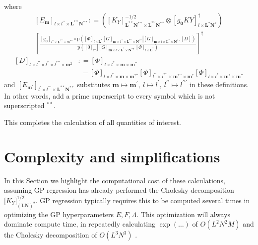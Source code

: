 \documentclass[preprint,12pt]{elsarticle}
\newcommand*{\M}[1]{\ensuremath{#1}\xspace}
\newcommand*{\x}{\times}
\newcommand*{\mi}[1]{\mathbf{#1}}
\newcommand*{\te}[2][]{\left\lbrack{#2}\right\rbrack_{#1}}
\newcommand*{\tte}[2][]{\lbrack{#2}\rbrack_{#1}}
\newcommand*{\prob}[3]{\M{\mathrm{p}\!\left(\left.{#1}\right\vert{#2,#3}\right)}}
\newcommand*{\deq}{\M{\mathrel{\mathop:}=}}
\begin{document}
        where
        \begin{multline*}
            \te[l\x l^{\prime\prime}\x \mi{L^{**}N^{**}}]{E_{\mi{m}}} \deq 
            \left(
                \te[\mi{L^{**}N^{**}}\x\mi{L^{*\prime\prime}N^{*\prime\prime}}]{K_{Y}}^{-1/2} \otimes \te[l\x\mi{L^{*}N^{*}}]{g_{\mi{0}}KY}^{\dagger} \right) \\
            \left\lbrack\frac{
            \te[l^{\prime\prime}\x\mi{L^{*\prime\prime}}\x\mi{N^{*\prime\prime}}]{g_{\mi{0}}} \circ
            \prob
            {\te[l\x \mi{L^{*}}]{\Phi} 
            \te[\mi{m}\x l^{\prime\prime}\x \mi{L^{*\prime\prime}\x N^{*\prime\prime}}]{G}}
            {\te[\mi{m}\x l\x \mi{L^{*}\x N^{*}}]{G}}
            {\te[]{D}}}
            {\prob{\te[\mi{m}]{0}}{\te[\mi{m}\x l\x \mi{L^{*}\x N^{*}}]{G}}{\te[l\x \mi{L^{*}}]{\Phi}}} \right\rbrack^{\dagger}
        \end{multline*}
        \begin{equation*}
            \begin{aligned}
                \te[l\x l^{\prime\prime} \x l^{*}\x l^{*\prime\prime}\x\mi{m}^{2}]{D} &\deq \te[l\x l^{*}\x\mi{m}\x\mi{m^{\prime\prime}}]{\Phi} \\ 
                &\phantom{:} - \te[l\x l^{*}\x\mi{m}\x\mi{m^{*\prime\prime}}]{\Phi}
                \te[l^{\prime\prime}\x l^{*\prime\prime}\x\mi{m^{*\prime\prime}}\x\mi{m^{*}}]{\Phi}
                \te[l\x l^{*}\x\mi{m^{*}}\x\mi{m^{\prime\prime}}]{\Phi}
            \end{aligned}
        \end{equation*}
        and $\te[l^{\prime}\x l^{\prime\prime\prime}\x \mi{L^{**}N^{**}}]{E_{\mi{m^{\prime}}}}$ substitutes $\mi{m}\mapsto\mi{m^{\prime}},\ l\mapsto l^{\prime},\ l^{\prime\prime}\mapsto l^{\prime\prime\prime}$ in these definitions. In other words, add a prime superscript to every symbol which is not superscripted $^{**}$.

        This completes the calculation of all quantities of interest.

\section{Complexity and simplifications}\label{sec:Complexity}
    In this Section we highlight the computational cost of these calculations, assuming GP regression has already performed the Cholesky decomposition $\tte[\mi{(LN)}^{2}]{K_{Y}}^{1/2}$. GP regression typically requires this to be computed several times in optimizing the GP hyperparameters $E, F, \Lambda$. This optimization will always dominate compute time, in repeatedly calculating $\exp(\ldots)$ of $O(L^{2}N^{2}M)$ and the Cholesky decomposition of $O(L^{3}N^{3})$ \cite{Dai2022}. 
    
\end{document}
